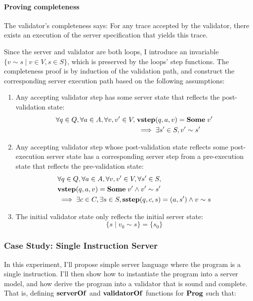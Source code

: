 \documentclass{article}
\theoremstyle{definition}
\newcommand{\sstep}{\ottkw{sstep}}
\newcommand{\vstep}{\ottkw{vstep}}
\newcommand{\Some}[1]{\ottkw{Some}\;#1}
\newcommand{\Prog}{\ottkw{Prog}}
\newcommand{\serverOf}{\ottkw{serverOf}}
\newcommand{\validatorOf}{\ottkw{validatorOf}}
\newcommand{\Reflects}[2]{#1\sim #2}
\begin{document}
\paragraph{Proving completeness}
The validator's completeness says: For any trace accepted by the validator,
there exists an execution of the server specification that yields this trace.

Since the server and validator are both loops, I introduce an invariable
$\{\Reflects{v}{s}\mid v\in V,s\in S\}$, which is preserved by the loops' step
functions.  The completeness proof is by induction of the validation path, and
construct the corresponding server execution path based on the following
assumptions:

\begin{enumerate}
\item Any accepting validator step has some server state that reflects the
  post-validation state:
  \begin{align*}
    \forall q\in Q,\forall a\in A,\forall v, v'\in V,\;&\vstep(q,a,v)=\Some{v'}\\
    &\implies\exists s'\in S,\Reflects{v'}{s'} 
  \end{align*}
\item Any accepting validator step whose post-validation state reflects some
  post-execution server state has a corresponding server step from a
  pre-execution state that reflects the pre-validation state:
  \begin{align*}
    &\forall q\in Q,\forall a\in A,\forall v,v'\in V,\forall s'\in S,\\
    &\vstep(q,a,v)=\Some{v'}\wedge\Reflects{v'}{s'}\\
    &\implies\exists c\in C,\exists s\in S,\sstep(q,c,s)=(a,s')\wedge\Reflects{v}{s}
  \end{align*}
\item The initial validator state only reflects the initial server state:
  \[\{s\mid\Reflects{v_0}{s}\}=\{s_0\}\]
\end{enumerate}

\subsubsection{Case Study: Single Instruction Server}

In this experiment, I'll propose simple server language where the program is a
single instruction.  I'll then show how to instantiate the program into a server
model, and how derive the program into a validator that is sound and complete.
That is, defining $\serverOf$ and $\validatorOf$ functions for $\Prog$ such
that:
\end{document}
